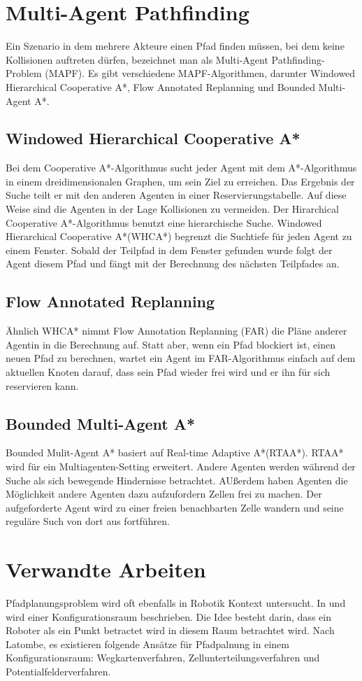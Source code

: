 \section{Multi-Agent Pathfinding}
Ein Szenario in dem mehrere Akteure einen Pfad finden müssen, bei dem keine Kollisionen auftreten dürfen, bezeichnet man als Multi-Agent Pathfinding-Problem (MAPF). Es gibt verschiedene MAPF-Algorithmen, darunter Windowed Hierarchical Cooperative A*, Flow Annotated Replanning und Bounded Multi-Agent A*.

\subsection{Windowed Hierarchical Cooperative A*}
Bei dem Cooperative A*-Algorithmus sucht jeder Agent mit dem A*-Algorithmus in einem dreidimensionalen Graphen, um sein Ziel zu erreichen. Das Ergebnis der Suche teilt er mit den anderen Agenten in einer Reservierungstabelle. Auf diese Weise sind die Agenten in der Lage Kollisionen zu vermeiden. Der Hirarchical Cooperative A*-Algorithmus benutzt eine hierarchische Suche. Windowed Hierarchical Cooperative A*(WHCA*) begrenzt die Suchtiefe für jeden Agent zu einem Fenster. Sobald der Teilpfad in dem Fenster gefunden wurde folgt der Agent diesem Pfad und fängt mit der Berechnung des nächsten Teilpfades an. 
\subsection{Flow Annotated Replanning}
Ähnlich WHCA* nimmt Flow Annotation Replanning (FAR) die Pläne anderer Agentin in die Berechnung auf. Statt aber, wenn ein Pfad blockiert ist, einen neuen Pfad zu berechnen, wartet ein Agent im FAR-Algorithmus einfach auf dem aktuellen Knoten darauf, dass sein Pfad wieder frei wird und er ihn für sich reservieren kann. 

\subsection{Bounded Multi-Agent A*}
Bounded Mulit-Agent A* basiert auf Real-time Adaptive A*(RTAA*). RTAA* wird für ein Multiagenten-Setting erweitert. Andere Agenten werden während der Suche als sich bewegende Hindernisse betrachtet. AUßerdem haben Agenten die Möglichkeit andere Agenten dazu aufzufordern Zellen frei zu machen. Der aufgeforderte Agent wird zu einer freien benachbarten Zelle wandern und seine reguläre Such von dort aus fortführen\cite{Sigurdson.2019}.


\section{Verwandte Arbeiten} 
Pfadplanungsproblem wird oft ebenfalls in Robotik Kontext untersucht. In \cite{lozano} und \cite{latombe} wird einer Konfigurationsraum beschrieben. Die Idee besteht darin, dass ein Roboter als ein Punkt betractet wird in diesem Raum betrachtet wird. Nach Latombe\cite{latombe}, es existieren folgende Ansätze für Pfadpalnung in einem Konfigurationsraum: Wegkartenverfahren, Zellunterteilungsverfahren und Potentialfelderverfahren.



